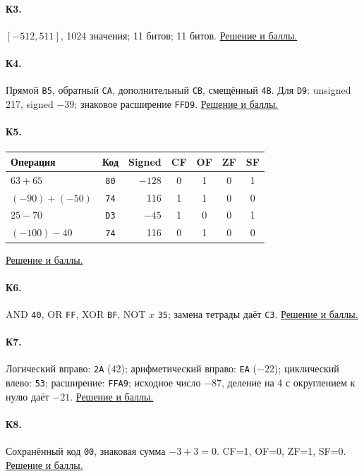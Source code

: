 \paragraph*{К3.}\label{ans:k3}
$[-512,511]$, 1024 значения; 11 битов; 11 битов.
\hyperref[sol:k3]{Решение и баллы.}

\paragraph*{К4.}\label{ans:k4}
Прямой \texttt{B5}, обратный \texttt{CA}, дополнительный \texttt{CB}, смещённый \texttt{4B}. Для \texttt{D9}: unsigned 217, signed $-39$; знаковое расширение \texttt{FFD9}.
\hyperref[sol:k4]{Решение и баллы.}

\paragraph*{К5.}\label{ans:k5}
\begin{center}
\begin{tabular}{l|c|r|cccc}
Операция & Код & Signed & CF & OF & ZF & SF\\\hline
$63+65$ & \texttt{80} & $-128$ & 0 & 1 & 0 & 1\\
$(-90)+(-50)$ & \texttt{74} & 116 & 1 & 1 & 0 & 0\\
$25-70$ & \texttt{D3} & $-45$ & 1 & 0 & 0 & 1\\
$(-100)-40$ & \texttt{74} & 116 & 0 & 1 & 0 & 0
\end{tabular}
\end{center}
\hyperref[sol:k5]{Решение и баллы.}

\paragraph*{К6.}\label{ans:k6}
AND \texttt{40}, OR \texttt{FF}, XOR \texttt{BF}, NOT $x$ \texttt{35}; замена тетрады даёт \texttt{C3}.
\hyperref[sol:k6]{Решение и баллы.}

\paragraph*{К7.}\label{ans:k7}
Логический вправо: \texttt{2A} (42); арифметический вправо: \texttt{EA} ($-22$); циклический влево: \texttt{53}; расширение: \texttt{FFA9}; исходное число $-87$, деление на 4 с округлением к нулю даёт $-21$.
\hyperref[sol:k7]{Решение и баллы.}

\paragraph*{К8.}\label{ans:k8}
Сохранённый код \texttt{00}, знаковая сумма $-3+3=0$. CF=1, OF=0, ZF=1, SF=0.
\hyperref[sol:k8]{Решение и баллы.}
